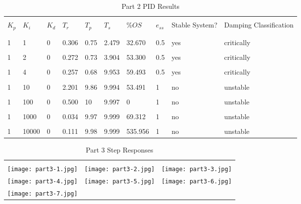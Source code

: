 \begin{table}[H]
	\begin{tabularx}{\textwidth}{XXXXXXXXXX}
		\toprule
		\\ $K_p$ & $K_i$ & $K_d$ & $T_r$ & $T_p$ & $T_s$ & $\%OS$ & $e_{ss}$ 
		& Stable System? & Damping Classification
		\\ \midrule
		
\\\midrule\\1&1&0&0.306&0.75&2.479&32.670&0.5&yes&critically 
\\\midrule\\1&2&0&0.272&0.73&3.904&53.300&0.5&yes&critically 
\\\midrule\\1&4&0&0.257&0.68&9.953&59.493&0.5&yes&critically 
\\\midrule\\1&10&0&2.201&9.86&9.994&53.491&1&no&unstable
\\\midrule\\1&100&0&0.500&10&9.997&0&1&no&unstable
\\\midrule\\1&1000&0&0.034&9.97&9.999&69.312&1&no&unstable
\\\midrule\\1&10000&0&0.111&9.98&9.999&535.956&1&no&unstable
		\\ \bottomrule
	\end{tabularx}
	\caption{Part 2 PID Results}
	\label{tab:pid2SimResults}
\end{table}
\begin{table}[H]
\begin{tabular}{ccc}
\toprule
\\ \texttt{[image: part3-1.jpg]} 
& \texttt{[image: part3-2.jpg]} 
& \texttt{[image: part3-3.jpg]} 
\\ \texttt{[image: part3-4.jpg]} 
& \texttt{[image: part3-5.jpg]} 
& \texttt{[image: part3-6.jpg]} 
\\ \texttt{[image: part3-7.jpg]} 
\\ \bottomrule
\end{tabular}
\caption{Part 3 Step Responses}
\end{table}
